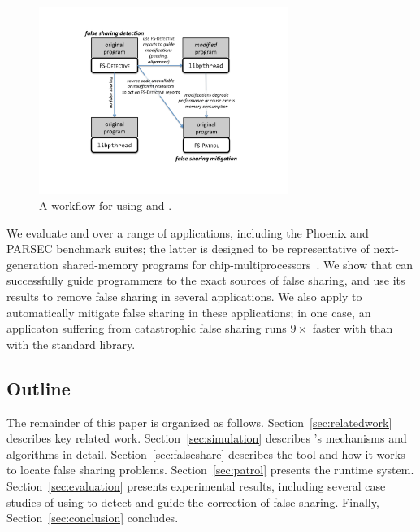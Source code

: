 \begin{figure}[!t]
\centering
\includegraphics[width=3.2in]{figure/sheriff-usecase.pdf}
\caption{A workflow for using \sheriffdetect{} and \sheriffprotect{}. 
\label{fig:usecase}}
\end{figure}

We evaluate \sheriffdetect{} and \sheriffprotect{} over a range of
applications, including the Phoenix and PARSEC benchmark suites; the latter is designed to be representative of
next-generation shared-memory programs for
chip-multiprocessors~\cite{parsec}. We
show that \sheriffdetect{} can successfully guide programmers to the
exact sources of false sharing, and use its results to remove false
sharing in several applications. We also apply \sheriffprotect{} to
automatically mitigate false sharing in these applications; in one
case, an applicaton suffering from catastrophic false sharing runs
$9\times$ faster with \sheriffprotect{} than with the
standard \pthreads{} library.

\subsection*{Outline}

The remainder of this paper is organized as
follows. Section~\ref{sec:relatedwork} describes key related work.
Section~\ref{sec:simulation} describes \sheriff{}'s mechanisms and
algorithms in detail.
Section~\ref{sec:falseshare} describes the \sheriffdetect{} tool and how it works to locate false sharing
problems.  
Section~\ref{sec:patrol} presents the \sheriffprotect{} runtime system.
Section~\ref{sec:evaluation}
presents experimental results, including several
case studies of using
\sheriffdetect{} to detect and guide the correction of false sharing. Finally, Section~\ref{sec:conclusion} concludes.

